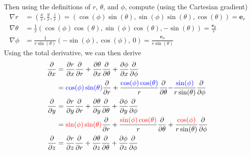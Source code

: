 \documentclass[a4paper]{article}
\begin{document}
\begin{enumerate}[label=(\alph*)]
\[	\]
	Then using the definitions of \( r \), \( \theta \), and \( \phi \), compute (using the Cartesian gradient)
	\begin{align*}
		\nabla r & = \!\left( \frac{x}{r}, \frac{y}{r}, \frac{z}{r} \right) = \!\left( \cos\!\left(\phi\right)\sin\!\left(\theta\right), \sin\!\left(\phi\right)\sin\!\left(\theta\right), \cos\!\left(\theta\right) \right) = \pmb{e}_{r} \\
		\nabla \theta & = \frac{1}{r}\!\left( \cos\!\left(\phi\right)\cos\!\left(\theta\right), \sin\!\left(\phi\right)\cos\!\left(\theta\right), -\sin\!\left(\theta\right) \right) = \frac{\pmb{e}_{\theta}}{r} \\
		\nabla \phi & = \frac{1}{r\sin\!\left( \theta \right)}\!\left( -\sin\!\left( \phi \right), \cos\!\left( \phi \right), \ 0 \right) = \frac{\pmb{e}_{\phi}}{r\sin\!\left( \theta \right)}
	\end{align*}
	Using the total derivative, we can then derive
	\begin{align*}
		\frac{\partial }{\partial x} & = \frac{\partial r}{\partial x}\frac{\partial }{\partial r} + \frac{\partial \theta}{\partial x}\frac{\partial }{\partial \theta} + \frac{\partial \phi}{\partial x}\frac{\partial }{\partial \phi} \\
					     & = \textcolor{blue}{\cos\!\left(\phi\right)\sin\!\left(\theta\right)}\frac{\partial }{\partial r} + \frac{\textcolor{blue}{\cos\!\left(\phi\right)\cos\!\left(\theta\right)}}{r}\frac{\partial }{\partial \theta} \textcolor{blue}{-} \frac{\textcolor{blue}{\sin\!\left(\phi\right)}}{r \sin\!\left(\theta\right)}\frac{\partial }{\partial \phi} \\
		\frac{\partial }{\partial y} & = \frac{\partial r}{\partial y}\frac{\partial }{\partial r} + \frac{\partial \theta}{\partial y}\frac{\partial }{\partial \theta} + \frac{\partial \phi}{\partial y}\frac{\partial }{\partial \phi} \\
					     & = \textcolor{red}{\sin\!\left(\phi\right)\sin\!\left(\theta\right)}\frac{\partial }{\partial r} + \frac{\textcolor{red}{\sin\!\left(\phi\right)\cos\!\left(\theta\right)}}{r}\frac{\partial }{\partial \theta} + \frac{\textcolor{red}{\cos\!\left(\phi\right)}}{r \sin\!\left(\theta\right)}\frac{\partial }{\partial \phi} \\
		\frac{\partial }{\partial z} & = \frac{\partial r}{\partial z}\frac{\partial }{\partial r} + \frac{\partial \theta}{\partial z}\frac{\partial }{\partial \theta} + \frac{\partial \phi}{\partial z}\frac{\partial }{\partial \phi} \\

\end{align*}
\end{enumerate}
\end{document}
